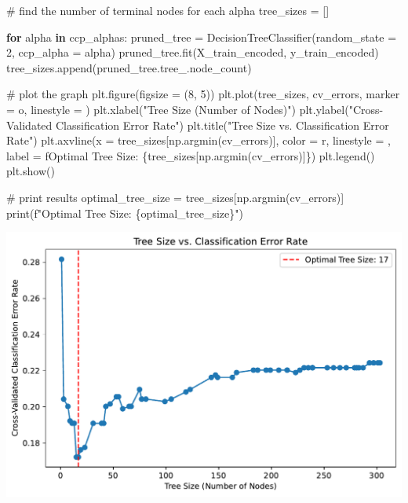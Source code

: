 \documentclass[
  letterpaper,
  DIV=11,
  numbers=noendperiod]{scrartcl}
\newenvironment{Shaded}{\begin{snugshade}}{\end{snugshade}}
\newcommand{\BuiltInTok}[1]{\textcolor[rgb]{0.00,0.23,0.31}{#1}}
\newcommand{\CommentTok}[1]{\textcolor[rgb]{0.37,0.37,0.37}{#1}}
\newcommand{\ControlFlowTok}[1]{\textcolor[rgb]{0.00,0.23,0.31}{\textbf{#1}}}
\newcommand{\DecValTok}[1]{\textcolor[rgb]{0.68,0.00,0.00}{#1}}
\newcommand{\KeywordTok}[1]{\textcolor[rgb]{0.00,0.23,0.31}{\textbf{#1}}}
\newcommand{\NormalTok}[1]{\textcolor[rgb]{0.00,0.23,0.31}{#1}}
\newcommand{\OperatorTok}[1]{\textcolor[rgb]{0.37,0.37,0.37}{#1}}
\newcommand{\SpecialCharTok}[1]{\textcolor[rgb]{0.37,0.37,0.37}{#1}}
\newcommand{\SpecialStringTok}[1]{\textcolor[rgb]{0.13,0.47,0.30}{#1}}
\newcommand{\StringTok}[1]{\textcolor[rgb]{0.13,0.47,0.30}{#1}}
\begin{document}
\begin{Shaded}
\begin{Highlighting}[]
\CommentTok{\# find the number of terminal nodes for each alpha}
\NormalTok{tree\_sizes }\OperatorTok{=}\NormalTok{ []}

\ControlFlowTok{for}\NormalTok{ alpha }\KeywordTok{in}\NormalTok{ ccp\_alphas:}
\NormalTok{    pruned\_tree }\OperatorTok{=}\NormalTok{ DecisionTreeClassifier(random\_state }\OperatorTok{=} \DecValTok{2}\NormalTok{, ccp\_alpha }\OperatorTok{=}\NormalTok{ alpha)}
\NormalTok{    pruned\_tree.fit(X\_train\_encoded, y\_train\_encoded)}
\NormalTok{    tree\_sizes.append(pruned\_tree.tree\_.node\_count) }

\CommentTok{\# plot the graph}
\NormalTok{plt.figure(figsize }\OperatorTok{=}\NormalTok{ (}\DecValTok{8}\NormalTok{, }\DecValTok{5}\NormalTok{))}
\NormalTok{plt.plot(tree\_sizes, cv\_errors, marker }\OperatorTok{=} \StringTok{\textquotesingle{}o\textquotesingle{}}\NormalTok{, linestyle }\OperatorTok{=} \StringTok{\textquotesingle{}{-}\textquotesingle{}}\NormalTok{)}
\NormalTok{plt.xlabel(}\StringTok{"Tree Size (Number of Nodes)"}\NormalTok{)}
\NormalTok{plt.ylabel(}\StringTok{"Cross{-}Validated Classification Error Rate"}\NormalTok{)}
\NormalTok{plt.title(}\StringTok{"Tree Size vs. Classification Error Rate"}\NormalTok{)}
\NormalTok{plt.axvline(x }\OperatorTok{=}\NormalTok{ tree\_sizes[np.argmin(cv\_errors)], color }\OperatorTok{=} \StringTok{\textquotesingle{}r\textquotesingle{}}\NormalTok{, linestyle }\OperatorTok{=} \StringTok{\textquotesingle{}{-}{-}\textquotesingle{}}\NormalTok{, }
\NormalTok{            label }\OperatorTok{=} \SpecialStringTok{f\textquotesingle{}Optimal Tree Size: }\SpecialCharTok{\{}\NormalTok{tree\_sizes[np.argmin(cv\_errors)]}\SpecialCharTok{\}}\SpecialStringTok{\textquotesingle{}}\NormalTok{)}
\NormalTok{plt.legend()}
\NormalTok{plt.show()}

\CommentTok{\# print results}
\NormalTok{optimal\_tree\_size }\OperatorTok{=}\NormalTok{ tree\_sizes[np.argmin(cv\_errors)]}
\BuiltInTok{print}\NormalTok{(}\SpecialStringTok{f"Optimal Tree Size: }\SpecialCharTok{\{}\NormalTok{optimal\_tree\_size}\SpecialCharTok{\}}\SpecialStringTok{"}\NormalTok{)}
\end{Highlighting}
\end{Shaded}

\includegraphics{Untitled-1_files/figure-pdf/cell-14-output-1.pdf}
\end{document}
